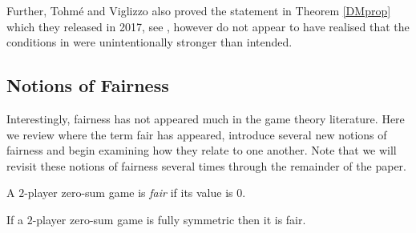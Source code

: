 Further, Tohm\'{e} and Viglizzo also proved the statement in Theorem \ref{DMprop} which they released in 2017, see \cite[Lemma 2.10]{ViglizzoarXiv}, however do not appear to have realised that the conditions in \cite[Defintion 7]{DMaskin} were unintentionally stronger than intended.

\subsection{Notions of Fairness} \label{subsec:labeldepnotionsoffairness}
Interestingly, fairness has not appeared much in the game theory literature. Here we review where the term fair has appeared, introduce several new notions of fairness and begin examining how they relate to one another. Note that we will revisit these notions of fairness several times through the remainder of the paper.

\begin{definition}
	A $2$-player zero-sum game is \textit{fair} \cite[17.11, 28.1, 28.2]{VNM} if its value is $0$.
\end{definition}

\begin{proposition} 
	\cite{VNM} If a $2$-player zero-sum game is fully symmetric then it is fair. 
\end{proposition}

